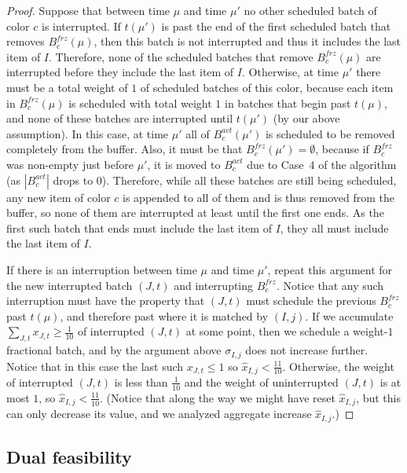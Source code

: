 \documentclass[12pt]{article}
\begin{document}
\begin{proof}
Suppose that between time $\mu$ and time $\mu'$ no other scheduled
batch of color $c$ is interrupted. If $t(\mu')$ is past the end of the first
scheduled batch that removes $B_c^{frz}(\mu)$, then this batch is not
interrupted and thus it includes the last item of $I$. Therefore,
none of the scheduled batches that remove $B_c^{frz}(\mu)$ are 
interrupted before they include the last item of $I$. Otherwise,
at time $\mu'$ there
must be a total weight of $1$ of scheduled batches of this color,
because each item in $B_c^{frz}(\mu)$ is scheduled with total weight
$1$ in batches that begin past $t(\mu)$, and none of these batches 
are interrupted until $t(\mu')$ (by our above assumption). In
this case, at time $\mu'$ all of $B_c^{act}(\mu')$ is scheduled to
be removed completely from the buffer. Also, it must be that
$B_c^{frz}(\mu') = \emptyset$, because if $B_c^{frz}$ was non-empty
just before $\mu'$, it is moved to $B_c^{act}$ due to Case~4 of
the algorithm (as $|B_c^{act}|$ drops to $0$). Therefore, while all
these batches are still being scheduled, any new item of color $c$
is appended to all of them and is thus removed from the buffer, so
none of them are interrupted at least until the first one ends. As the
first such batch that ends must include the last item of $I$, they
all must include the last item of $I$.

If there is an interruption between time $\mu$ and time $\mu'$,
repeat this argument for the new interrupted batch $(J,t)$ and
interrupting $B_c^{frz}$. Notice that any such interruption must
have the property that $(J,t)$ must schedule the previous $B_c^{frz}$ 
past $t(\mu)$, and therefore past where it is matched by $(I,j)$.
If we accumulate $\sum_{J,t} x_{J,t}\ge\frac{1}{10}$ of
interrupted $(J,t)$ at some point, then we schedule a 
weight-$1$ fractional batch, and by the argument above
$\sigma_{I,j}$ does not increase further. Notice that in this
case the last such $x_{J,t}\le 1$ so $\hat{x}_{I,j}< \frac {11}{10}$.
Otherwise, the weight
of interrupted $(J,t)$ is less than $\frac{1}{10}$ and the weight
of uninterrupted $(J,t)$ is at most $1$, so
$\hat{x}_{I,j}< \frac{11}{10}$. (Notice that along the way we
might have reset $\hat{x}_{I,j}$, but this can only decrease its
value, and we analyzed aggregate increase $\hat{x}_{I,j}$.)
\end{proof}


\subsection{Dual feasibility}
\end{document}
